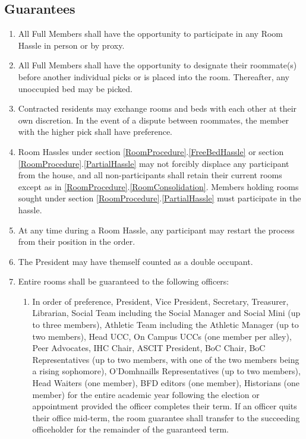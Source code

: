 \documentclass[10pt]{article} %
\begin{document}
\subsection{Guarantees}
\label{Guarantees}
\begin{enumerate}
\item All Full Members shall have the opportunity to participate in any Room Hassle in person or by proxy.
\item All Full Members shall have the opportunity to designate their roommate(s) before another individual picks or is placed into the room. Thereafter, any unoccupied bed may be picked.
\item Contracted residents may exchange rooms and beds with each other at their own discretion. In the event of a dispute between roommates, the member with the higher pick shall have preference.
\item Room Hassles under section \ref{RoomProcedure}.\ref{FreeBedHassle} or section \ref{RoomProcedure}.\ref{PartialHassle} may not forcibly displace any participant from the house, and all non-participants shall retain their current rooms except as in \ref{RoomProcedure}.\ref{RoomConsolidation}. Members holding rooms sought under section \ref{RoomProcedure}.\ref{PartialHassle} must participate in the hassle.
\item At any time during a Room Hassle, any participant may restart the process from their position in the order.
\item The President may have themself counted as a double occupant.
\item Entire rooms shall be guaranteed to the following officers:
\begin{enumerate}
\item In order of preference, President, Vice President, Secretary, Treasurer, Librarian, Social Team including the Social Manager and Social Mini (up to three members), Athletic Team including the Athletic Manager (up to two members), Head UCC, On Campus UCCs (one member per alley), Peer Advocates, IHC Chair, ASCIT President, BoC Chair, BoC Representatives (up to two members, with one of the two members being a rising sophomore), O'Domhnaills Representatives (up to two members), Head Waiters (one member), BFD editors (one member), Historians (one member) for the entire academic year following the election or appointment provided the officer completes their term. If an officer quits their office mid-term, the room guarantee shall transfer to the succeeding officeholder for the remainder of the guaranteed term.

\end{enumerate}
\end{enumerate}
\end{document}
